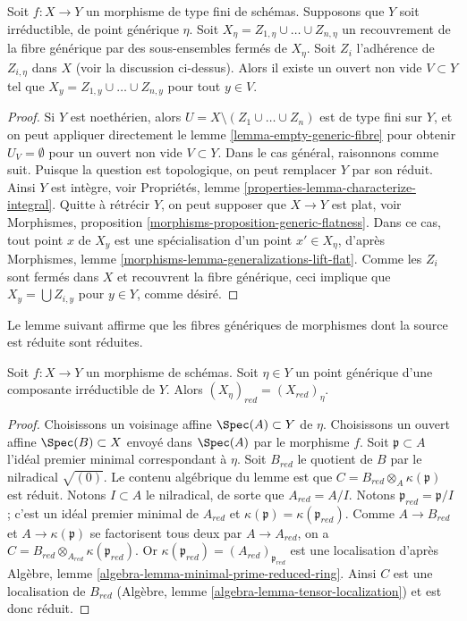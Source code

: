 \begin{lemma}
\label{lemma-cover-generic-fibre-neighbourhood}
Soit $f : X \to Y$ un morphisme de type fini de schémas. Supposons que
$Y$ soit irréductible, de point générique $\eta$. Soit
$X_\eta = Z_{1, \eta} \cup \ldots \cup Z_{n, \eta}$ un recouvrement de
la fibre générique par des sous-ensembles fermés de $X_\eta$.
Soit $Z_i$ l'adhérence de $Z_{i, \eta}$ dans $X$ (voir la discussion ci-dessus).
Alors il existe un ouvert non vide $V \subset Y$ tel
que $X_y = Z_{1, y} \cup \ldots \cup Z_{n, y}$ pour tout $y \in V$.
\end{lemma}

\begin{proof}
Si $Y$ est noethérien, alors $U = X \setminus (Z_1 \cup \ldots \cup Z_n)$
est de type fini sur $Y$, et on peut appliquer directement le
lemme \ref{lemma-empty-generic-fibre}
pour obtenir $U_V = \emptyset$ pour un ouvert non vide $V \subset Y$.
Dans le cas général, raisonnons comme suit. Puisque la question est topologique,
on peut remplacer $Y$ par son réduit. Ainsi $Y$ est intègre, voir
Propriétés, lemme \ref{properties-lemma-characterize-integral}.
Quitte à rétrécir $Y$, on peut supposer que $X \to Y$ est plat, voir
Morphismes, proposition \ref{morphisms-proposition-generic-flatness}.
Dans ce cas, tout point $x$ de $X_y$ est une spécialisation d'un point
$x' \in X_\eta$, d'après
Morphismes, lemme \ref{morphisms-lemma-generalizations-lift-flat}.
Comme les $Z_i$ sont fermés dans $X$ et recouvrent la fibre générique, ceci
implique que $X_y = \bigcup Z_{i, y}$ pour $y \in Y$, comme désiré.
\end{proof}

\noindent
Le lemme suivant affirme que les fibres génériques de morphismes dont la source est
réduite sont réduites.

\begin{lemma}
\label{lemma-reduction-generic-fibre}
Soit $f : X \to Y$ un morphisme de schémas. Soit $\eta \in Y$ un point générique
d'une composante irréductible de $Y$. Alors
$(X_\eta)_{red} = (X_{red})_\eta$.
\end{lemma}

\begin{proof}
Choisissons un voisinage affine $\Spec(A) \subset Y$ de $\eta$.
Choisissons un ouvert affine $\Spec(B) \subset X$ envoyé dans
$\Spec(A)$ par le morphisme $f$. Soit $\mathfrak p \subset A$ l'idéal premier minimal
correspondant à $\eta$. Soit $B_{red}$ le quotient de $B$ par
le nilradical $\sqrt{(0)}$. Le contenu algébrique du lemme est que
$C = B_{red} \otimes_A \kappa(\mathfrak p)$ est réduit.
Notons $I \subset A$ le nilradical, de sorte que $A_{red} = A/I$.
Notons $\mathfrak p_{red} = \mathfrak p/I$ ;
c'est un idéal premier minimal de $A_{red}$ et
$\kappa(\mathfrak p) = \kappa(\mathfrak p_{red})$.
Comme $A \to B_{red}$ et $A \to \kappa(\mathfrak p)$
se factorisent tous deux par $A \to A_{red}$, on a
$C = B_{red} \otimes_{A_{red}} \kappa(\mathfrak p_{red})$.
Or $\kappa(\mathfrak p_{red}) = (A_{red})_{\mathfrak p_{red}}$
est une localisation d'après
Algèbre, lemme \ref{algebra-lemma-minimal-prime-reduced-ring}.
Ainsi $C$ est une localisation de $B_{red}$
(Algèbre, lemme \ref{algebra-lemma-tensor-localization})
et est donc réduit.
\end{proof}

